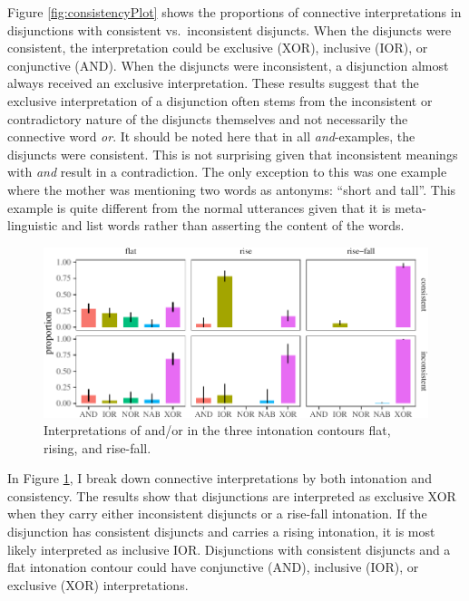 \documentclass[floatsintext,man]{apa6}
\theoremstyle{definition}
\theoremstyle{definition}
\theoremstyle{definition}
\theoremstyle{remark}
\begin{document}
Figure \ref{fig:consistencyPlot} shows the proportions of connective
interpretations in disjunctions with consistent vs.~inconsistent
disjuncts. When the disjuncts were consistent, the interpretation could
be exclusive (XOR), inclusive (IOR), or conjunctive (AND). When the
disjuncts were inconsistent, a disjunction almost always received an
exclusive interpretation. These results suggest that the exclusive
interpretation of a disjunction often stems from the inconsistent or
contradictory nature of the disjuncts themselves and not necessarily the
connective word \emph{or}. It should be noted here that in all
\emph{and}-examples, the disjuncts were consistent. This is not
surprising given that inconsistent meanings with \emph{and} result in a
contradiction. The only exception to this was one example where the
mother was mentioning two words as antonyms: \enquote{short and tall}.
This example is quite different from the normal utterances given that it
is meta-linguistic and list words rather than asserting the content of
the words.

\begin{figure}[tb]

{\centering \includegraphics{figs/consistencyByintonationPlot-1} 

}

\caption{Interpretations of and/or in the three intonation contours flat, rising, and rise-fall.}\label{fig:consistencyByintonationPlot}
\end{figure}

In Figure \ref{fig:consistencyByintonationPlot}, I break down connective
interpretations by both intonation and consistency. The results show
that disjunctions are interpreted as exclusive XOR when they carry
either inconsistent disjuncts or a rise-fall intonation. If the
disjunction has consistent disjuncts and carries a rising intonation, it
is most likely interpreted as inclusive IOR. Disjunctions with
consistent disjuncts and a flat intonation contour could have
conjunctive (AND), inclusive (IOR), or exclusive (XOR) interpretations.
\end{document}
